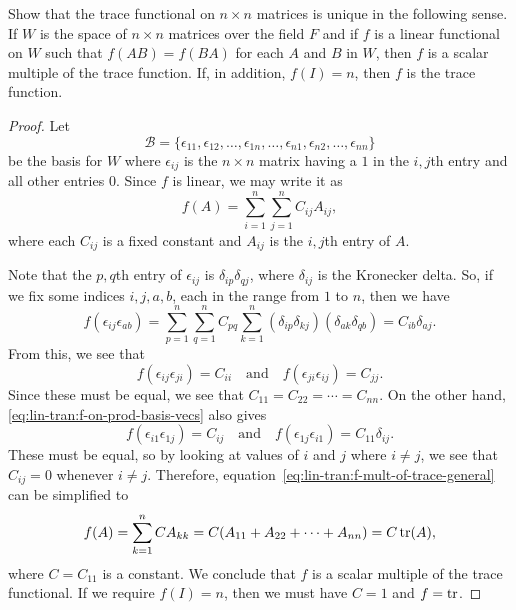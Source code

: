  Show that the trace functional on $n\times n$ matrices
is unique in the following sense. If $W$ is the space of $n\times n$
matrices over the field $F$ and if $f$ is a linear functional on $W$
such that $f(AB) = f(BA)$ for each $A$ and $B$ in $W$, then $f$ is a
scalar multiple of the trace function. If, in addition, $f(I) = n$,
then $f$ is the trace function.
\begin{proof}
  Let
  \begin{equation*}
    \mathcal{B} = \{\epsilon_{11}, \epsilon_{12}, \dots, \epsilon_{1n},
    \dots, \epsilon_{n1}, \epsilon_{n2}, \dots, \epsilon_{nn}\}
  \end{equation*}
  be the basis for $W$ where $\epsilon_{ij}$ is the $n\times n$ matrix
  having a $1$ in the $i,j$th entry and all other entries $0$. Since
  $f$ is linear, we may write it as
  \begin{equation}
    \label{eq:lin-tran:f-mult-of-trace-general}
    f(A) = \sum_{i=1}^n\sum_{j=1}^nC_{ij}A_{ij},
  \end{equation}
  where each $C_{ij}$ is a fixed constant and $A_{ij}$ is the $i,j$th
  entry of $A$.

  Note that the $p,q$th entry of $\epsilon_{ij}$ is
  $\delta_{ip}\delta_{qj}$, where $\delta_{ij}$ is the Kronecker
  delta. So, if we fix some indices $i,j,a,b$, each in the range from
  $1$ to $n$, then we have
  \begin{equation}
    \label{eq:lin-tran:f-on-prod-basis-vecs}
    f(\epsilon_{ij}\epsilon_{ab})
    = \sum_{p=1}^n\sum_{q=1}^nC_{pq}\sum_{k=1}^n(\delta_{ip}\delta_{kj})
      (\delta_{ak}\delta_{qb})
    = C_{ib}\delta_{aj}.
  \end{equation}
  From this, we see that
  \begin{equation*}
    f(\epsilon_{ij}\epsilon_{ji}) = C_{ii} \quad\text{and}\quad
    f(\epsilon_{ji}\epsilon_{ij}) = C_{jj}.
  \end{equation*}
  Since these must be equal, we see that
  $C_{11} = C_{22} = \cdots = C_{nn}$. On the other hand,
  \eqref{eq:lin-tran:f-on-prod-basis-vecs} also gives
  \begin{equation*}
    f(\epsilon_{i1}\epsilon_{1j}) = C_{ij} \quad\text{and}\quad
    f(\epsilon_{1j}\epsilon_{i1}) = C_{11}\delta_{ij}.
  \end{equation*}
  These must be equal, so by looking at values of $i$ and $j$ where
  $i\neq j$, we see that $C_{ij} = 0$ whenever $i\neq j$. Therefore,
  equation~\eqref{eq:lin-tran:f-mult-of-trace-general} can be
  simplified to
  \begin{equation*}
    f(A) = \sum_{k=1}^nCA_{kk}
    = C(A_{11} + A_{22} + \cdots + A_{nn}) = C\operatorname{tr}(A),
  \end{equation*}
  where $C = C_{11}$ is a constant. We conclude that $f$ is a scalar
  multiple of the trace functional. If we require $f(I) = n$, then we
  must have $C = 1$ and $f = \operatorname{tr}$.
\end{proof}


